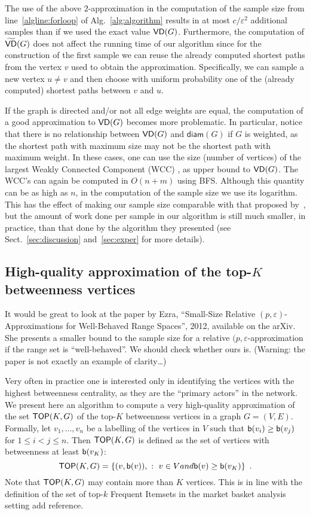 The use of the above $2$-approximation in the computation of the
sample size from line~\ref{algline:forloop} of Alg.~\ref{alg:algorithm} results
in at most $c/\varepsilon^2$ additional samples than if we
used the exact value $\mathsf{VD}(G)$. Furthermore, the computation of $\widetilde{\mathsf{VD}}(G)$
does not affect the running time of our algorithm since for the construction of
the first sample we can reuse the already computed shortest paths from the
vertex $v$ used to obtain the approximation. Specifically, we can sample a new
vertex $u\neq v$ and then choose with uniform probability one of the
(already computed) shortest paths between $v$ and $u$.

If the graph is directed and/or not all edge weights are equal, the computation of a good
approximation to $\mathsf{VD}(G)$ becomes more problematic. In particular, notice that
there is no relationship between $\mathsf{VD}(G)$ and $\mathsf{diam}(G)$ if $G$ is
weighted, as the shortest path with maximum size may not be the shortest path
with maximum weight. In these cases, one can use
the size (number of vertices) of the largest Weakly Connected Component (WCC) ,
as upper bound to $\mathsf{VD}(G)$. The WCC's can again be computed in $O(n+m)$ using
BFS. Although this quantity can be as high as $n$, in the computation of the
sample size we use its logarithm. This has the effect of making our sample size
comparable with that proposed by~\citet{BrandesP07}, but the amount of work done
per sample in our algorithm is still much smaller, in practice, than that done
by the algorithm they presented (see Sect.~\ref{sec:discussion}
and~\ref{sec:exper} for more details).

\subsection{High-quality approximation of the top-$K$ betweenness
vertices}\label{sec:topk}
\XXX It would be great to look at the paper by Ezra, ``Small-Size Relative
$(p,\varepsilon)$-Approximations for Well-Behaved Range Spaces'', 2012,
available on the arXiv. She presents a smaller bound to the sample size for a
relative $(p,\varepsilon$-approximation if the range set is ``well-behaved''. We
should check whether ours is. (Warning: the paper is not exactly an example of
clarity\ldots)

Very often in practice one is interested only in identifying the vertices with
the highest betweenness centrality, as they are the ``primary actors'' in the
network. We present here an algorithm to compute a very high-quality
approximation of the set $\mathsf{TOP}(K,G)$ of the top-$K$ betweenness vertices in a graph
$G=(V,E)$. Formally, let $v_1,\dotsc,v_n$ be a labelling of the vertices in $V$
such that $\mathsf{b}(v_i)\ge\mathsf{b}(v_j)$ for $1\le i<j\le n$. Then $\mathsf{TOP}(K,G)$ is
defined as the set of vertices with betweenness at least $\mathsf{b}(v_K)$:
\[
\mathsf{TOP}(K,G)=\{(v,\mathsf{b}(v)), ~:~ v\in V \relax{ and } \mathsf{b}(v)\ge\mathsf{b}(v_K)\}\enspace.
\]
Note that $\mathsf{TOP}(K,G)$ may contain more than $K$ vertices. This is in line with
the definition of the set of top-$k$ Frequent Itemsets in the market basket
analysis setting \XXX add reference.

